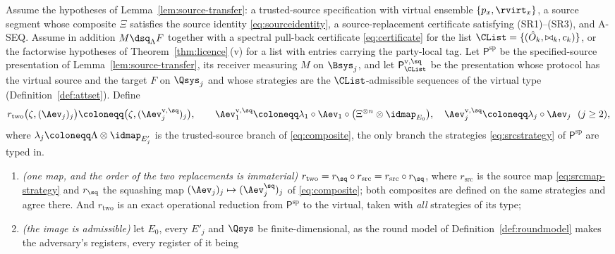 \begin{theorem}\label{thm:two-sided}
Assume the hypotheses of Lemma~\ref{lem:source-transfer}: a trusted-source
specification with virtual ensemble $\{p_x,\rvirt_x\}$, a source segment
whose composite $\Xi$ satisfies the source identity
\eqref{eq:sourceidentity}, a source-replacement certificate satisfying
(SR1)--(SR3), and A-SEQ. Assume in addition $M\dsq_{\Lambda}F$ together with
a spectral pull-back certificate \eqref{eq:certificate} for the list
$\CList=\{(\hat O_k,\bowtie_k,c_k)\}$, or the factorwise hypotheses of
Theorem~\ref{thm:licence}\,(v) for a list with entries carrying the
party-local tag. Let $\mathsf{P}^{\mathrm{sp}}$ be the specified-source
presentation of Lemma~\ref{lem:source-transfer}, its receiver measuring $M$
on $\Bsys_j$, and let $\mathsf{P}^{\mathrm{v},\sq}_{\CList}$ be the
presentation whose protocol has the virtual source and the target $F$ on
$\Qsys_j$ and whose strategies are the $\CList$-admissible sequences of the
virtual type (Definition~\ref{def:attset}). Define
\begin{equation}\label{eq:twosidedmap}
  r_{\mathrm{two}}\big(\zeta,(\Aev_j)_j\big)
  \coloneqq\big(\zeta,(\Aev^{\mathrm{v},\sq}_j)_j\big),
  \qquad
  \Aev^{\mathrm{v},\sq}_1
    \coloneqq\lambda_1\circ\Aev_1\circ
      \big(\Xi^{\otimes n}\otimes\idmap_{E_0}\big),
  \quad
  \Aev^{\mathrm{v},\sq}_j\coloneqq\lambda_j\circ\Aev_j\ \ (j\ge2),
\end{equation}
where $\lambda_j\coloneqq\Lambda\otimes\idmap_{E'_j}$ is the trusted-source
branch of \eqref{eq:composite}, the only branch the strategies
\eqref{eq:srcstrategy} of $\mathsf{P}^{\mathrm{sp}}$ are typed in.
\begin{enumerate}[label=(\roman*),leftmargin=3.0em]
\item \emph{(one map, and the order of the two replacements is immaterial)}
  $r_{\mathrm{two}}=r_{\sq}\circ r_{\mathrm{src}}
  =r_{\mathrm{src}}\circ r_{\sq}$, where $r_{\mathrm{src}}$ is the source map
  \eqref{eq:srcmap-strategy} and $r_{\sq}$ the squashing map
  $(\Aev_j)_j\mapsto(\Aev^{\sq}_j)_j$ of \eqref{eq:composite}; both composites
  are defined on the same strategies and agree there. And $r_{\mathrm{two}}$ is
  an exact operational reduction from $\mathsf{P}^{\mathrm{sp}}$ to the
  virtual,  taken with \emph{all} strategies of its type;
\item \emph{(the image is admissible)} let $E_0$, every $E'_j$ and $\Qsys$ be
  finite-dimensional, as the round model of Definition~\ref{def:roundmodel}
  makes the adversary's registers, every register of it being

\end{enumerate}
\end{theorem}
